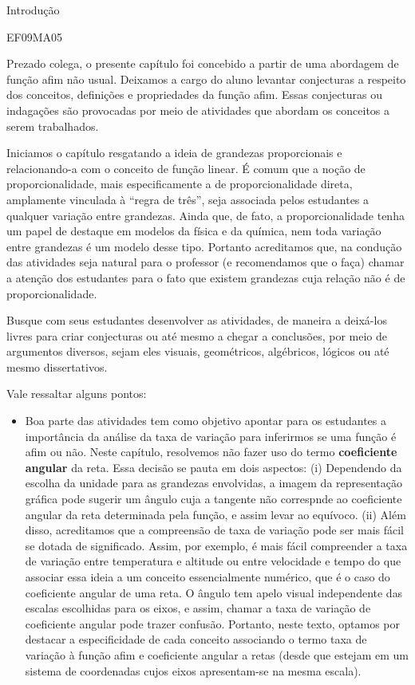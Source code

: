 \begin{apresentacao}{Introdução}
\begin{habilities}{EF09MA05}
\end{habilities}

Prezado colega, o presente capítulo foi concebido a partir de uma abordagem de função afim não usual. Deixamos a cargo do aluno levantar conjecturas a respeito dos conceitos, definições e propriedades da função afim. Essas conjecturas ou indagações são provocadas por meio de atividades que abordam os conceitos a serem trabalhados.
\columnbreak

Iniciamos o capítulo resgatando a ideia de grandezas proporcionais e relacionando-a com o conceito de função linear. É comum que a noção de proporcionalidade, mais especificamente a de proporcionalidade direta, amplamente vinculada à “regra de três”, seja associada pelos estudantes a qualquer variação entre grandezas. Ainda que, de fato, a proporcionalidade tenha um papel de destaque em modelos da física e da química, nem toda variação entre grandezas é um modelo desse tipo. Portanto acreditamos que, na condução das atividades seja natural para o professor (e recomendamos que o faça) chamar a atenção dos estudantes para o fato que existem grandezas cuja relação não é de proporcionalidade.

Busque com seus estudantes desenvolver as atividades, de maneira a deixá-los livres para criar conjecturas ou até mesmo a chegar a conclusões, por meio de argumentos diversos, sejam eles visuais, geométricos, algébricos, lógicos ou até mesmo dissertativos.

Vale ressaltar alguns pontos:
\begin{itemize}
\item {} 
Boa parte das atividades tem como objetivo apontar para os estudantes a importância da análise da taxa de variação para inferirmos se uma função é afim ou não. Neste capítulo, resolvemos não fazer uso do termo \textbf{coeficiente angular} da reta. Essa decisão se pauta em dois aspectos: (i) Dependendo da escolha da unidade para as grandezas envolvidas, a imagem da representação gráfica pode sugerir um ângulo cuja a tangente não correspnde ao coeficiente angular da reta determinada pela função, e assim levar ao equívoco. (ii) Além disso, acreditamos que a compreensão de taxa de variação pode ser mais fácil se dotada de significado. Assim, por exemplo, é mais fácil compreender a taxa de variação entre temperatura e altitude ou entre velocidade e tempo do que associar essa ideia a um conceito essencialmente numérico, que é o caso do coeficiente angular de uma reta. O ângulo tem apelo visual independente das escalas escolhidas para os eixos, e assim, chamar a taxa de variação de coeficiente angular pode trazer confusão. Portanto, neste texto, optamos por destacar a especificidade de cada conceito associando o termo taxa de variação à função afim e coeficiente angular a retas (desde que estejam em um sistema de coordenadas cujos eixos apresentam-se na mesma escala).


\end{itemize}
\end{apresentacao}

